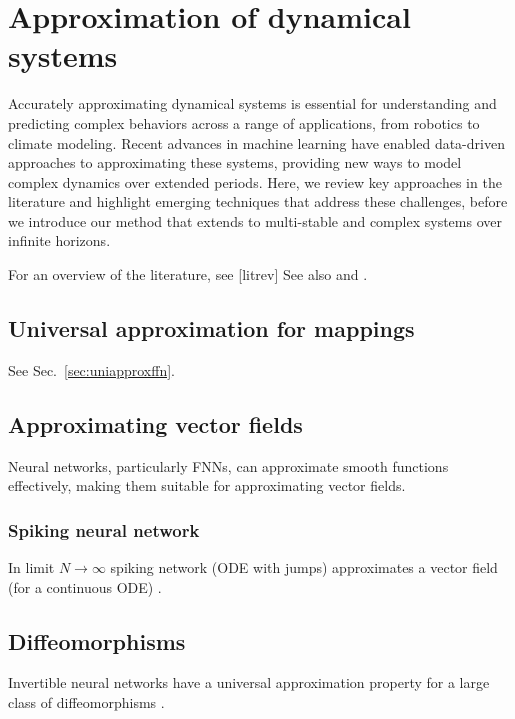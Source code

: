 \documentclass{article}
\theoremstyle{definition}
\theoremstyle{remark}
\begin{document}
\section{Approximation of dynamical systems}

Accurately approximating dynamical systems is essential for understanding and predicting complex behaviors across a range of applications, from robotics to climate modeling.
Recent advances in machine learning have enabled data-driven approaches to approximating these systems, providing new ways to model complex dynamics over extended periods.
Here, we review key approaches in the literature and highlight emerging techniques that address these challenges, before we introduce our method that extends to multi-stable and complex systems over infinite horizons.

For an overview of the literature, see [litrev]
See also \citep{li2022approximation} and \citep{jiang2023brief}.



\subsection{Universal approximation for mappings}

See Sec.~\ref{sec:uniapproxffn}.


\subsection{Approximating vector fields}
Neural networks, particularly FNNs, can approximate smooth functions effectively, making them suitable for approximating vector fields.

\subsubsection{Spiking neural network}
In limit $N\rightarrow\infty$ spiking network (ODE with jumps) approximates a vector field (for a continuous ODE) \citep{podlaski2024approximating}. 



\subsection{Diffeomorphisms}
Invertible neural networks have a universal approximation property for a  large class of diffeomorphisms   \citep{ishikawa2023universal}.
\end{document}
